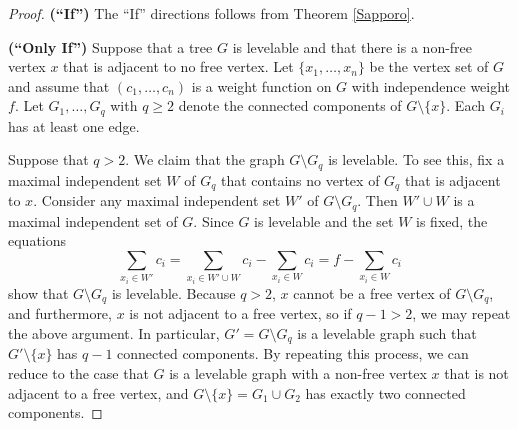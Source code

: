 \documentclass[12pt]{amsart}
\numberwithin{equation}{section}
\theoremstyle{definition}
\newcounter{i} %
\begin{document}
\begin{proof}
{\bf (``If'')} The ``If'' directions follows from
Theorem \ref{Sapporo}.  

{\bf (``Only If'')}
Suppose that a tree $G$ is levelable and that there is a non-free vertex $x$ that is adjacent to no free vertex. Let $\{x_1, \ldots, x_n\}$ be the vertex set of $G$ and assume that $(c_1, \ldots, c_n)$ is a weight function on $G$ with independence weight $f$. Let $G_1, \ldots, G_q$ with $q \geq 2$ denote the connected components of $G \setminus \{x\}$.  Each $G_i$ has at least one edge. 

Suppose that $q> 2$. We claim that
the graph $G \setminus G_q$ is levelable. 
To see this, fix a maximal
independent set $W$ of $G_q$ that contains no vertex
of $G_q$ that is adjacent to $x$.  Consider any 
maximal independent set $W'$ of $G \setminus G_q$.  Then
$W' \cup W$ is a maximal independent set of $G$.  Since
$G$ is levelable and the set $W$ is fixed, the equations
\[
\sum_{x_i \in W'}c_i = \sum_{x_i \in W' \cup W}c_i  - \sum_{x_i \in W}c_i=
f  - \sum_{x_i \in W}c_i
\]
show that 
$G \setminus G_q$ is levelable. Because
$q > 2$, $x$ cannot be a free vertex of $G \setminus G_q$,
and furthermore, $x$ is not adjacent to a free vertex, so
if $q-1 > 2$, we may repeat the above argument.
In particular, $G' = G \setminus G_q$ is a levelable
graph such that $G'\setminus \{x\}$ has $q-1$ connected 
components.  By repeating this process, we can
reduce to the case that $G$ is a levelable graph
with a non-free vertex $x$ that is not
adjacent to a free vertex, and $G\setminus \{x\} = G_1 \cup G_2$
has exactly two connected components.




\end{proof}
\end{document}
